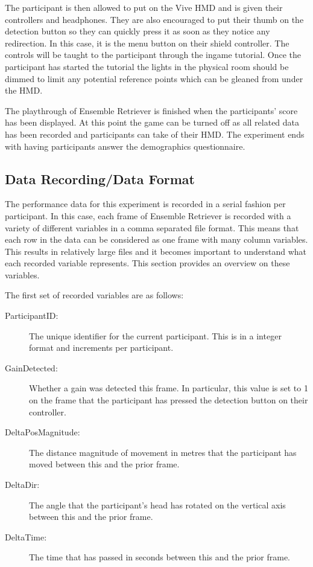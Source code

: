 The participant is then allowed to put on the Vive HMD and is given their controllers and headphones. They are also encouraged to put their thumb on the detection button so they can quickly press it as soon as they notice any redirection. In this case, it is the menu button on their shield controller. The controls will be taught to the participant through the ingame tutorial. Once the participant has started the tutorial the lights in the physical room should be dimmed to limit any potential reference points which can be gleaned from under the HMD.

The playthrough of Ensemble Retriever is finished when the participants' score has been displayed. At this point the game can be turned off as all related data has been recorded and participants can take of their HMD. The experiment ends with having participants answer the demographics questionnaire. 

\subsection{Data Recording/Data Format}\label{sec:ex1dataformat}
The performance data for this experiment is recorded in a serial fashion per participant. In this case, each frame of Ensemble Retriever is recorded with a variety of different variables in a comma separated file format. This means that each row in the data can be considered as one frame with many column variables. This results in relatively large files and it becomes important to understand what each recorded variable represents. This section provides an overview on these variables.

The first set of recorded variables are as follows:
\begin{description}
   \item[ParticipantID:] The unique identifier for the current participant. This is in a integer format and increments per participant. 
   \item[GainDetected:] Whether a gain was detected this frame. In particular, this value is set to 1 on the frame that the participant has pressed the detection button on their controller. 
   \item[DeltaPosMagnitude:] The distance magnitude of movement in metres that the participant has moved between this and the prior frame. 
   \item[DeltaDir:] The angle that the participant's head has rotated on the vertical axis between this and the prior frame. 
   \item[DeltaTime:] The time that has passed in seconds between this and the prior frame. 
\end{description}

